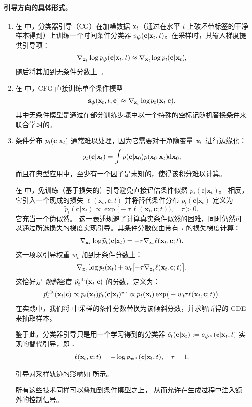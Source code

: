 \paragraph{引导方向的具体形式。}
\begin{enumerate}[leftmargin=*]
\item {} 在  中，分类器引导（CG）在加噪数据 ${\mathbf{x}}_t$（通过在水平 $t$ 上破坏带标签的干净样本得到）上训练一个时间条件分类器
$p_{{\bm{\psi}}}({\mathbf{c}} | {\mathbf{x}}_t, t)$。在采样时，其输入梯度提供引导项：
\[
\nabla_{{\mathbf{x}}_t}\log p_{{\bm{\psi}}}({\mathbf{c}} | {\mathbf{x}}_t, t)
 \approx  \nabla_{{\mathbf{x}}_t}\log p_t({\mathbf{c}} | {\mathbf{x}}_t),
\]
随后将其加到无条件分数上~\citep{dhariwal2021diffusion}。
\item {} 在  中，CFG 直接训练单个条件模型
\[
{\mathbf{s}}_{{\bm{\phi}}}({\mathbf{x}}_t,t,{\mathbf{c}}) \approx \nabla_{{\mathbf{x}}_t}\log p_t({\mathbf{x}}_t|{\mathbf{c}}),
\]
其中无条件模型是通过在部分训练步骤中以一个特殊的空标记随机替换条件来联合学习的。
\item {}  条件分布 $p_t({\mathbf{c}}| {\mathbf{x}}_t)$ 通常难以处理，因为它需要对干净隐变量 ${\mathbf{x}}_0$ 进行边缘化：
\[
p_t({\mathbf{c}}| {\mathbf{x}}_t)
= \int p({\mathbf{c}}| {\mathbf{x}}_0)  p({\mathbf{x}}_0| {\mathbf{x}}_t)  \mathrm d{\mathbf{x}}_0,
\]
而且在典型应用中，至少有一个因子是未知的，使得该积分难以计算。

在  中，免训练（基于损失的）引导避免直接评估条件似然 $p_t(\mathbf{c}| \mathbf{x}_t)$。
相反，它引入一个现成的损失 $\ell(\mathbf{x}_t,\mathbf{c};t)$
并将替代条件分布 $\widetilde p_t(\mathbf{c}|\mathbf{x}_t) $ 定义为
\[
\widetilde p_t(\mathbf{c}|\mathbf{x}_t) \propto \exp\!\big(-\tau\,\ell(\mathbf{x}_t,\mathbf{c};t)\big),
\quad \tau>0,
\]
它充当一个伪似然。
这一表述规避了计算真实条件似然的困难，同时仍然可以通过所选损失的梯度实现引导。其条件分数仅由带有 $\tau$ 的损失梯度计算：
\[
\nabla_{{\mathbf{x}}_t}\log \widetilde p_t({\mathbf{c}}|{\mathbf{x}}_t)
= -\tau \nabla_{{\mathbf{x}}_t}\ell({\mathbf{x}}_t,{\mathbf{c}}; t).
\]
这一项以引导权重 $w_t$ 加到无条件分数上：
\[
  \nabla_{{\mathbf{x}}_t}\log p_t({\mathbf{x}}_t)
 + w_t \bigl[-\tau \nabla_{{\mathbf{x}}_t}\ell({\mathbf{x}}_t,{\mathbf{c}}; t)\bigr].
\]
这恰好是 \emph{倾斜}密度 $\widetilde p_t^{\mathrm{tilt}}({\mathbf{x}}_t| {\mathbf{c}})$ 的分数，定义为：
\[
\widetilde p_t^{\mathrm{tilt}}({\mathbf{x}}_t| {\mathbf{c}}) \propto  p_t({\mathbf{x}}_t) \widetilde p_t({\mathbf{c}}| {\mathbf{x}}_t)^{w_t}
 \propto  p_t({\mathbf{x}}_t) \exp\!\big(-w_t\tau \ell({\mathbf{x}}_t,{\mathbf{c}}; t)\big).
\]
在实践中，我们将  中采样的条件分数替换为该倾斜分数，并求解所得的 ODE 来抽取样本。

鉴于此，分类器引导只是用一个学习得到的分类器 $\widetilde p_t(\mathbf{c}|\mathbf{x}_t):=p_{{\bm{\psi}}^\times}({\mathbf{c}}| {\mathbf{x}}_t,t)$ 实现的替代引导，即：
\[
\ell({\mathbf{x}}_t,{\mathbf{c}}; t) = -\log p_{{\bm{\psi}}^\times}({\mathbf{c}}| {\mathbf{x}}_t,t), \quad \tau=1.
\]

引导对采样轨迹的影响如  所示。

所有这些技术同样可以叠加到条件模型之上，
从而允许在生成过程中注入额外的控制信号。

\end{enumerate}
